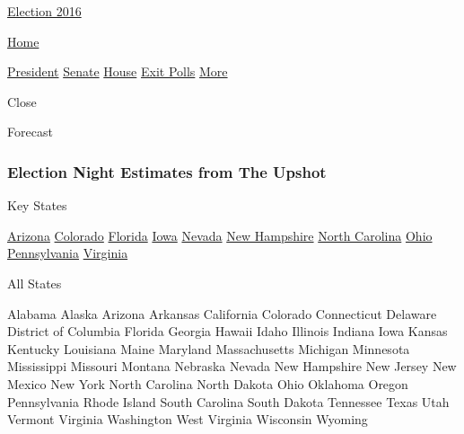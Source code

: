 \href{//www.nytimes3xbfgragh.onion}{}
\href{//elections.nytimes3xbfgragh.onion}{ Election 2016}

\href{//www.nytimes3xbfgragh.onion}{ Home}

\href{//www.nytimes3xbfgragh.onion/elections/2016/results/president}{President}
\href{//www.nytimes3xbfgragh.onion/elections/2016/results/senate}{Senate}
\href{//www.nytimes3xbfgragh.onion/elections/2016/results/house}{House}
\href{//www.nytimes3xbfgragh.onion/interactive/2016/11/08/us/politics/election-exit-polls.html}{Exit
Polls} \href{//www.nytimes3xbfgragh.onion/elections\#}{More}

Close

Forecast

\href{//www.nytimes3xbfgragh.onion/elections/2016/forecast/president}{}

\hypertarget{election-night-estimates-from-the-upshot}{%
\subsubsection{Election Night Estimates from The
Upshot}\label{election-night-estimates-from-the-upshot}}

Key States

\href{//www.nytimes3xbfgragh.onion/elections/2016/results/arizona}{Arizona}
\href{//www.nytimes3xbfgragh.onion/elections/2016/results/colorado}{Colorado}
\href{//www.nytimes3xbfgragh.onion/elections/2016/results/florida}{Florida}
\href{//www.nytimes3xbfgragh.onion/elections/2016/results/iowa}{Iowa}
\href{//www.nytimes3xbfgragh.onion/elections/2016/results/nevada}{Nevada}
\href{//www.nytimes3xbfgragh.onion/elections/2016/results/new-hampshire}{New
Hampshire}
\href{//www.nytimes3xbfgragh.onion/elections/2016/results/north-carolina}{North
Carolina}
\href{//www.nytimes3xbfgragh.onion/elections/2016/results/ohio}{Ohio}
\href{//www.nytimes3xbfgragh.onion/elections/2016/results/pennsylvania}{Pennsylvania}
\href{//www.nytimes3xbfgragh.onion/elections/2016/results/virginia}{Virginia}

All States

Alabama Alaska Arizona Arkansas California Colorado Connecticut Delaware
District of Columbia Florida Georgia Hawaii Idaho Illinois Indiana Iowa
Kansas Kentucky Louisiana Maine Maryland Massachusetts Michigan
Minnesota Mississippi Missouri Montana Nebraska Nevada New Hampshire New
Jersey New Mexico New York North Carolina North Dakota Ohio Oklahoma
Oregon Pennsylvania Rhode Island South Carolina South Dakota Tennessee
Texas Utah Vermont Virginia Washington West Virginia Wisconsin Wyoming

